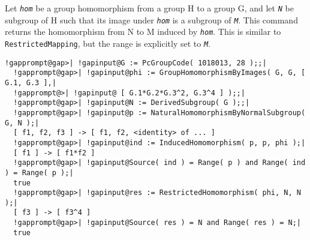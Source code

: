 \documentclass[a4paper,11pt]{report}
\begin{document}
{{{ Let \mbox{\texttt{\mdseries\slshape hom}} be a group homomorphism from a group H to a group G, and let \mbox{\texttt{\mdseries\slshape N}} be subgroup of H such that its image under \mbox{\texttt{\mdseries\slshape hom}} is a subgroup of \mbox{\texttt{\mdseries\slshape M}}. This command returns the homomorphism from N to M induced by \mbox{\texttt{\mdseries\slshape hom}}. This is similar to \texttt{RestrictedMapping}, but the range is explicitly set to \mbox{\texttt{\mdseries\slshape M}}. }

 
\begin{Verbatim}[commandchars=!@|,fontsize=\small,frame=single,label=Example]
  !gapprompt@gap>| !gapinput@G := PcGroupCode( 1018013, 28 );;|
  !gapprompt@gap>| !gapinput@phi := GroupHomomorphismByImages( G, G, [ G.1, G.3 ],|
  !gapprompt@>| !gapinput@ [ G.1*G.2*G.3^2, G.3^4 ] );;|
  !gapprompt@gap>| !gapinput@N := DerivedSubgroup( G );;|
  !gapprompt@gap>| !gapinput@p := NaturalHomomorphismByNormalSubgroup( G, N );|
  [ f1, f2, f3 ] -> [ f1, f2, <identity> of ... ]
  !gapprompt@gap>| !gapinput@ind := InducedHomomorphism( p, p, phi );|
  [ f1 ] -> [ f1*f2 ]
  !gapprompt@gap>| !gapinput@Source( ind ) = Range( p ) and Range( ind ) = Range( p );|
  true
  !gapprompt@gap>| !gapinput@res := RestrictedHomomorphism( phi, N, N );|
  [ f3 ] -> [ f3^4 ]
  !gapprompt@gap>| !gapinput@Source( res ) = N and Range( res ) = N;|
  true
\end{Verbatim}
 }

 }

   
\end{document}
